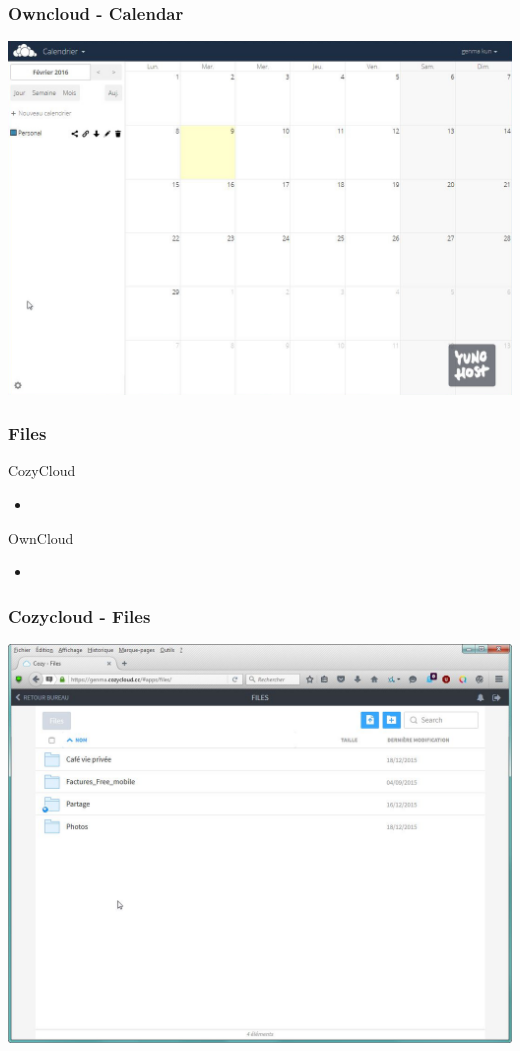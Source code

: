 \documentclass{beamer}
\begin{document}
\begin{frame}
\frametitle{Owncloud - Calendar}
\includegraphics[scale=0.3] {./Owncloud/Owncloud_Calendrier.jpg}
\end{frame}

\begin{frame}
\frametitle{Files}

\begin{block}{CozyCloud}
\begin{itemize}
\item 
\end{itemize}
\end{block}

\begin{block}{OwnCloud}
\begin{itemize}
\item 
\end{itemize}
\end{block}
\end{frame}


\begin{frame}
\frametitle{Cozycloud - Files}
\includegraphics[scale=0.35] {./CozyCloud/CozyCloud_Files.jpg}
\end{frame}
\end{document}
